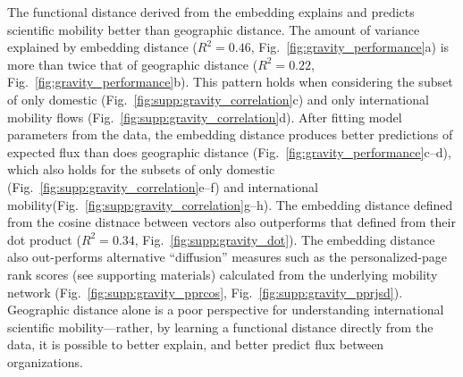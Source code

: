 \documentclass[12pt]{article} %
\begin{document}
The functional distance derived from the embedding explains and predicts scientific mobility better than geographic distance.
The amount of variance explained by embedding distance ($R^{2} = 0.46$, Fig.~\ref{fig:gravity_performance}a) is more than twice that of geographic distance ($R^{2} = 0.22$, Fig.~\ref{fig:gravity_performance}b).
This pattern holds when considering the subset of only domestic (Fig.~\ref{fig:supp:gravity_correlation}c) and only international mobility flows (Fig.~\ref{fig:supp:gravity_correlation}d).
After fitting model parameters from the data, the embedding distance produces better predictions of expected flux than does geographic distance (Fig.~\ref{fig:gravity_performance}c--d), which also holds for the subsets of only domestic (Fig.~\ref{fig:supp:gravity_correlation}e--f) and international mobility(Fig.~\ref{fig:supp:gravity_correlation}g--h).
The embedding distance defined from the cosine distnace between vectors also outperforms that defined from their dot product ($R^{2} = 0.34$, Fig.~\ref{fig:supp:gravity_dot}).
The embedding distance also out-performs alternative ``diffusion'' measures such as the personalized-page rank scores (see supporting materials) calculated from the underlying mobility network (Fig.~\ref{fig:supp:gravity_pprcos}, Fig.~\ref{fig:supp:gravity_pprjsd}).
Geographic distance alone is a poor perspective for understanding international scientific mobility---rather, by learning a functional distance directly from the data, it is possible to better explain, and better predict flux between organizations.
\end{document}
